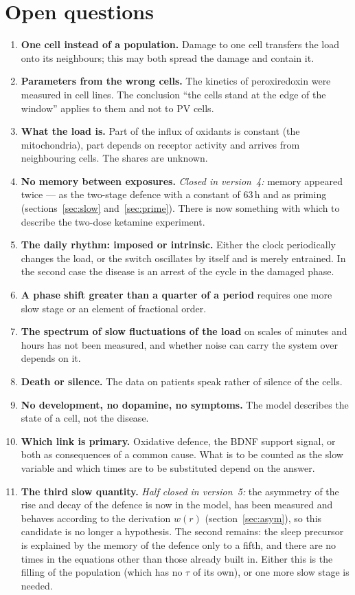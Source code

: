 \section{Open questions}\label{sec:crit}
\begin{enumerate}
\item \textbf{One cell instead of a population.} Damage to one cell transfers the load onto its neighbours; this may both spread the damage and contain it.
\item \textbf{Parameters from the wrong cells.} The kinetics of peroxiredoxin were measured in cell lines. The conclusion ``the cells stand at the edge of the window'' applies to them and not to PV cells.
\item \textbf{What the load is.} Part of the influx of oxidants is constant (the mitochondria), part depends on receptor activity and arrives from neighbouring cells. The shares are unknown.
\item \textbf{No memory between exposures.} \emph{Closed in version~4:} memory appeared twice --- as the two-stage defence with a constant of 63\,h and as priming (sections~\ref{sec:slow} and~\ref{sec:prime}). There is now something with which to describe the two-dose ketamine experiment.
\item \textbf{The daily rhythm: imposed or intrinsic.} Either the clock periodically changes the load, or the switch oscillates by itself and is merely entrained. In the second case the disease is an arrest of the cycle in the damaged phase.
\item \textbf{A phase shift greater than a quarter of a period} requires one more slow stage or an element of fractional order.
\item \textbf{The spectrum of slow fluctuations of the load} on scales of minutes and hours has not been measured, and whether noise can carry the system over depends on it.
\item \textbf{Death or silence.} The data on patients speak rather of silence of the cells.
\item \textbf{No development, no dopamine, no symptoms.} The model describes the state of a cell, not the disease.
\item \textbf{Which link is primary.} Oxidative defence, the BDNF support signal, or both as consequences of a common cause. What is to be counted as the slow variable and which times are to be substituted depend on the answer.
\item \textbf{The third slow quantity.} \emph{Half closed in version~5:} the asymmetry of the rise and decay of the defence is now in the model, has been measured and behaves according to the derivation $w(r)$ (section~\ref{sec:asym}), so this candidate is no longer a hypothesis. The second remains: the sleep precursor is explained by the memory of the defence only to a fifth, and there are no times in the equations other than those already built in. Either this is the filling of the population (which has no $\tau$ of its own), or one more slow stage is needed.

\end{enumerate}
